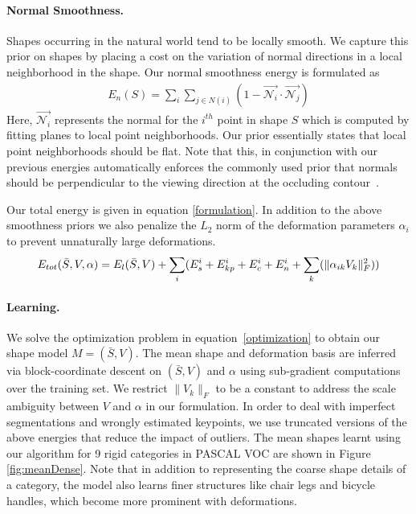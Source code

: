 \paragraph{Normal Smoothness.} Shapes occurring in the natural world tend to be locally smooth. We capture this prior on shapes by placing a cost on the variation of normal directions in a local neighborhood in the shape. Our normal smoothness energy is formulated as
\begin{gather}
 \label{eq:normal_con}E_{n}(S)=\underset{i}{\sum}\underset{j\in N(i)}{\sum}(1-\vec{\mathcal{N}_i} \cdot \vec{\mathcal{N}_j})
\end{gather}
 Here, $\vec{\mathcal{N}_i}$ represents the normal for the $i^{th}$ point in shape $S$ which is computed by fitting planes to local point neighborhoods. Our prior essentially states that local point neighborhoods should be flat. Note that this, in conjunction with our previous energies automatically enforces the commonly used prior that normals should be perpendicular to the viewing direction at the occluding contour~\cite{Barron2012B}.

Our total energy is given in equation \eqref{formulation}. In addition to the above smoothness priors we also penalize the $L_2$ norm of the deformation parameters $\alpha_i$ to prevent unnaturally large deformations.
\begin{gather}
\eqlabel{formulation}
E_{tot}(\bar{S},V,\alpha) = E_{l}(\bar{S},V)+\underset{i}{\sum}(E_{s}^i+E_{kp}^i+E_{c}^i+E_{n}^i+\underset{k}{\sum}(\|\alpha_{ik}V_k\|_F^{2}))
\end{gather}


\paragraph{Learning.} We solve the optimization problem in equation~\eqref{optimization} to obtain our shape model $M=(\bar{S},V)$. The mean shape and deformation basis are inferred via block-coordinate descent on $(\bar{S},V)$ and $\alpha$ using sub-gradient computations over the training set. We restrict $\|V_k\|_F$ to be a constant to address the scale ambiguity between $V$ and $\alpha$ in our formulation. In order to deal with imperfect segmentations and wrongly estimated keypoints, we use truncated versions of the above energies that reduce the impact of outliers. The mean shapes learnt using our algorithm for 9 rigid categories in PASCAL VOC are shown in Figure \ref{fig:meanDense}. Note that in addition to representing the coarse shape details of a category, the model also learns finer structures like chair legs and bicycle handles, which become more prominent with deformations.

